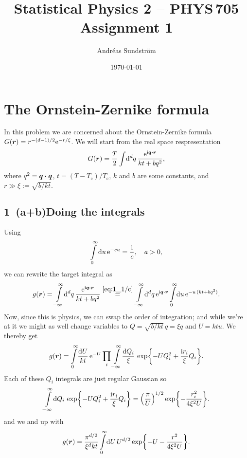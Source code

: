 \documentclass[11pt,letter, swedish, english
]{article}
\newcommand{\Tc}{\ensuremath{T_{\text{c}}}}
\begin{document}




\title{Statistical Physics 2 -- PHYS\,705 \\
Assignment 1}
\author{Andréas Sundström}
\date{\today}

\maketitle


\section{The Ornstein-Zernike formula}
In this problem we are concerned about the Ornstein-Zernike formula 
$G(\vb*r)=r^{-(d-1)/2}\mathrm{e}^{-r/\xi}$. We will start from the real space
respresentation 
\begin{equation}\label{eq:1_start}
G(\vb*r) = \frac{T}{2}\int\!\rd^dq\,\frac{\ee^{\ii\vb*q\vdot\vb*r}}{kt+bq^2},
\end{equation}
where $q^2=\vb*q\vdot\vb*q$, $t=(T-\Tc)/\Tc$, $k$ and $b$ are some
constants, and $r\gg\xi:=\sqrt{b/kt}$.

\subsection*{1~(a+b)\quad Doing the integrals}\addtocounter{subsection}{1}
Using 
\begin{equation}\label{eq:1_1/c}
\int_0^\infty\rd{u}\,\ee^{-cu}=\frac{1}{c}
\qcomma a>0,
\end{equation}
we can rewrite the target integral as
\begin{equation}
g(\vb*r)=\int_{-\infty}^\infty\!\rd^dq\,
\frac{\ee^{\ii\vb*q\vdot\vb*r}}{kt+bq^2}
\stackrel{\eqref{eq:1_1/c}}{=}
\int_{-\infty}^\infty\!\rd^dq\, \ee^{\ii\vb*q\vdot\vb*r}
\int_0^\infty\!\rd{u}\,\ee^{-u\,(kt+bq^2)}.
\end{equation}
Now, since this is physics\footnotemark{}, we can swap the order of
integration; and while we're at it we might as well change variables
to $Q=\sqrt{b/kt}\,q=\xi q$ and $U=ktu$. We thereby get
\begin{equation}
g(\vb*r)=\int_0^\infty\!\frac{\rd{U}}{kt}\,\ee^{-U}
\prod_i\int_{-\infty}^\infty\!\frac{\rd{Q}_i}{\xi}\,
 \exp{-UQ_i^2+\frac{\ii r_i}{\xi}Q_i}.
\end{equation}
Each of these $Q_i$ integrals are just regular Gaussian so
\begin{equation}
\int_{-\infty}^\infty\!\rd{Q}_i\,
 \exp{-UQ_i^2+\frac{\ii r_i}{\xi}Q_i}
=\qty(\frac{\pi}{U})^{1/2}\exp{-\frac{r_i^2}{4\xi^2U}}.
\end{equation}
and we and up with
\begin{equation}\label{eq:1b_end}
g(\vb*r)=\frac{\pi^{d/2}}{\xi^d kt}\int_0^\infty\!\rd{U}\,
U^{d/2}\exp{-U-\frac{r^2}{4\xi^2U}}.
\end{equation}
\end{document}
